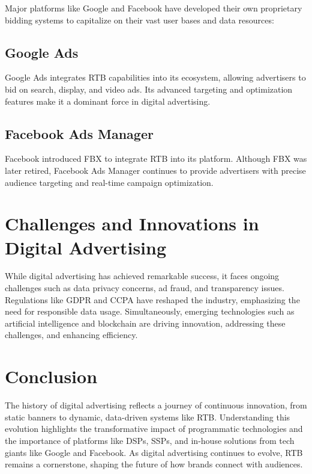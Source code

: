 \documentclass[../main.tex]{subfiles}
\begin{document}
	Major platforms like Google and Facebook have developed their own proprietary bidding systems to capitalize on their vast user bases and data resources:
	
	\subsection*{Google Ads}
	
	Google Ads integrates RTB capabilities into its ecosystem, allowing advertisers to bid on search, display, and video ads. Its advanced targeting and optimization features make it a dominant force in digital advertising.
	
	\subsection*{Facebook Ads Manager}
	
	Facebook introduced FBX to integrate RTB into its platform. Although FBX was later retired, Facebook Ads Manager continues to provide advertisers with precise audience targeting and real-time campaign optimization.
	
	\section*{Challenges and Innovations in Digital Advertising}
	
	While digital advertising has achieved remarkable success, it faces ongoing challenges such as data privacy concerns, ad fraud, and transparency issues. Regulations like GDPR and CCPA have reshaped the industry, emphasizing the need for responsible data usage. Simultaneously, emerging technologies such as artificial intelligence and blockchain are driving innovation, addressing these challenges, and enhancing efficiency.
	
	\section*{Conclusion}
	
	The history of digital advertising reflects a journey of continuous innovation, from static banners to dynamic, data-driven systems like RTB. Understanding this evolution highlights the transformative impact of programmatic technologies and the importance of platforms like DSPs, SSPs, and in-house solutions from tech giants like Google and Facebook. As digital advertising continues to evolve, RTB remains a cornerstone, shaping the future of how brands connect with audiences.
	
	
	
\end{document}
